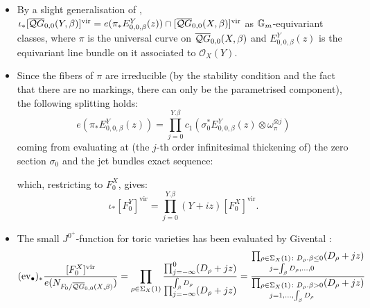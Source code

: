\begin{center}
\end{center}

\begin{itemize}[leftmargin=*]
 \item By a slight generalisation of \cite[Propositions 6.2.2 and 6.2.3]{CFKM}, $\iota_*[\overline{\mathcal QG}_{0,0}(Y,\beta)]^{\text{vir}}=e(\pi_* E^Y_{0,0,\beta}(z))\cap[\overline{\mathcal QG}_{0,0}(X,\beta)]^{\text{vir}}$ as $\mathbb{G}_m$-equivariant classes, where $\pi$ is the universal curve on $\overline{\mathcal QG}_{0,0}(X,\beta)$ and $E^Y_{0,0,\beta}(z)$ is the equivariant line bundle on it associated to $\mathcal O_X(Y)$.
 \item Since the fibers of $\pi$ are irreducible (by the stability condition and the fact that there are no markings, there can only be the parametrised component), the following splitting holds:
 \[
  e(\pi_* E^Y_{0,0,\beta}(z))=\prod_{j=0}^{Y.\beta} c_1(\sigma_0^* E^Y_{0,0,\beta}(z)\otimes \omega_{\pi}^{\otimes j})
 \]
coming from evaluating at (the $j$-th order infinitesimal thickening of) the zero section $\sigma_0$ and the jet bundles exact sequence:
\begin{center}
\end{center}
which, restricting to $F_0^X$, gives:
\[
 \iota_*[F_0^Y]^{\text{vir}}=\prod_{j=0}^{Y.\beta}(Y+iz)[F_0^X]^{\text{vir}}.
\]
 \item The small $J^{0^+}$-function for toric varieties has been evaluated by Givental \cite{Givental-equivariantGW}\cite[Definition 7.2.8]{CF-K}:
 \[
  (\operatorname{ev}_{\bullet})_*\frac{[F_0^X]^{\text{vir}}}{e(N_{F_0/\overline{\mathcal QG}_{0,0}(X,\beta)})}=\prod_{\rho\in\Sigma_X(1)}\frac{\prod_{j=-\infty}^0(D_{\rho}+jz)}{\prod_{j=-\infty}^{\int_{\beta}D_{\rho}}(D_\rho+jz)}=\frac{\prod_{\substack{\rho\in\Sigma_X(1)\colon D_\rho.\beta\leq 0 \\ j=\int_{\beta}D_\rho,\ldots,0}}(D_{\rho}+jz)}{\prod_{\substack{\rho\in\Sigma_X(1)\colon D_\rho.\beta> 0 \\ j=1,\ldots,\int_{\beta}D_\rho}}(D_{\rho}+jz)}
\]
\end{itemize}
